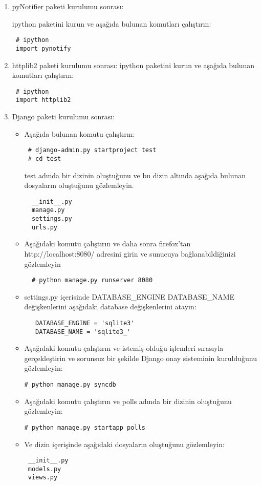 \documentclass[a4paper,10pt]{article}
\begin{document}
\begin{enumerate}
\item pyNotifier paketi kurulumu sonrası:

ipython paketini kurun ve aşağıda bulunan komutları çalıştırın:
\begin{verbatim}
 # ipython
 import pynotify
\end{verbatim}


\item httplib2 paketi kurulumu sonrası:
ipython paketini kurun ve aşağıda bulunan komutları çalıştırın:
\begin{verbatim}
 # ipython
 import httplib2
\end{verbatim}

 \item Django paketi kurulumu sonrası:
\begin{itemize}
 \item Aşağıda bulunan komutu çalıştırın:
 \begin{verbatim}
 # django-admin.py startproject test
 # cd test
 \end{verbatim}
 test adında bir dizinin oluştuğunu ve bu dizin altında aşağıda bulunan dosyaların oluştuğunu gözlemleyin.
  \begin{verbatim}
  __init__.py
  manage.py
  settings.py
  urls.py 
  \end{verbatim}
 \item Aşağıdaki komutu çalıştırın ve daha sonra firefox'tan http://localhost:8080/ adresini girin ve sunucuya bağlanabildiğinizi gözlemleyin
  \begin{verbatim}
  # python manage.py runserver 8080
  \end{verbatim}
 \item settings.py içerisinde DATABASE\_ENGINE DATABASE\_NAME değişkenlerini aşağıdaki database değişkenlerini atayın:
  \begin{verbatim}
   DATABASE_ENGINE = 'sqlite3'
   DATABASE_NAME = 'sqlite3_'   
  \end{verbatim}
\item Aşağıdaki komutu çalıştırın ve istemiş olduğu işlemleri sırasıyla gerçekleştirin ve sorunsuz bir şekilde Django onay sisteminin kurulduğunu gözlemleyin:
\begin{verbatim}
# python manage.py syncdb 
\end{verbatim}
\item Aşağıdaki komutu çalıştırın ve polls adında bir dizinin oluştuğunu gözlemleyin:
\begin{verbatim}
# python manage.py startapp polls 
\end{verbatim}
\item Ve dizin içerişinde aşağıdaki dosyaların oluştuğunu gözlemleyin:
\begin{verbatim}
 __init__.py
 models.py
 views.py
\end{verbatim}


\end{itemize}
\end{enumerate}
\end{document}
